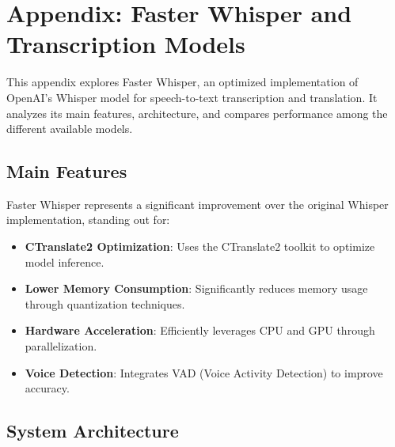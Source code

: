 \chapter{Appendix: Faster Whisper and Transcription Models}
\label{appendix-faster-whisper}

This appendix explores Faster Whisper, an optimized implementation of OpenAI's Whisper model for speech-to-text transcription and translation. It analyzes its main features, architecture, and compares performance among the different available models.

\section{Main Features}
\label{sec:faster-whisper-features}

Faster Whisper represents a significant improvement over the original Whisper implementation, standing out for:

\begin{itemize}
	\item \textbf{CTranslate2 Optimization}: Uses the CTranslate2 toolkit to optimize model inference.
	\item \textbf{Lower Memory Consumption}: Significantly reduces memory usage through quantization techniques.
	\item \textbf{Hardware Acceleration}: Efficiently leverages CPU and GPU through parallelization.
	\item \textbf{Voice Detection}: Integrates VAD (Voice Activity Detection) to improve accuracy.
\end{itemize}

\section{System Architecture}
\label{sec:faster-whisper-architecture}

